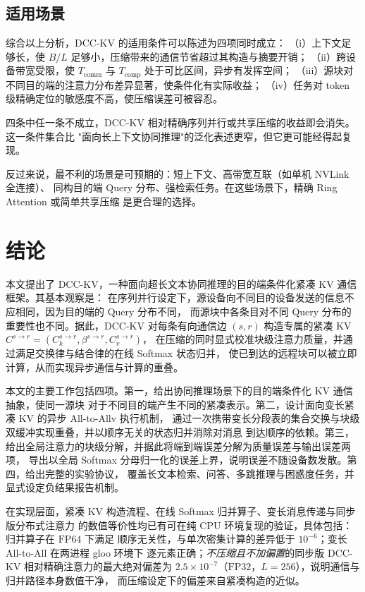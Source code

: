\subsection{适用场景}

综合以上分析，DCC-KV 的适用条件可以陈述为四项同时成立：
（i）上下文足够长，使 $B/L$ 足够小，压缩带来的通信节省超过其构造与摘要开销；
（ii）跨设备带宽受限，使 $T_{\text{comm}}$ 与 $T_{\text{comp}}$ 处于可比区间，异步有发挥空间；
（iii）源块对不同目的端的注意力分布差异显著，使条件化有实际收益；
（iv）任务对 token 级精确定位的敏感度不高，使压缩误差可被容忍。

四条中任一条不成立，DCC-KV 相对精确序列并行或共享压缩的收益即会消失。这一条件集合比
"面向长上下文协同推理"的泛化表述更窄，但它更可能经得起复现。

反过来说，最不利的场景是可预期的：短上下文、高带宽互联（如单机 NVLink 全连接）、
同构目的端 Query 分布、强检索任务。在这些场景下，精确 Ring Attention 或简单共享压缩
是更合理的选择。

\section{结论}
\label{sec:conclusion}

本文提出了 DCC-KV，一种面向超长文本协同推理的目的端条件化紧凑 KV 通信框架。其基本观察是：
在序列并行设定下，源设备向不同目的设备发送的信息不应相同，因为目的端的 Query 分布不同，
而源块中各条目对不同 Query 分布的重要性也不同。据此，DCC-KV 对每条有向通信边 $(s,r)$
构造专属的紧凑 KV $C^{s\to r} = (C_k^{s\to r}, \beta^{s\to r}, C_v^{s\to r})$，
在压缩的同时显式校准块级注意力质量，并通过满足交换律与结合律的在线 Softmax 状态归并，
使已到达的远程块可以被立即计算，从而实现异步通信与计算的重叠。

本文的主要工作包括四项。第一，给出协同推理场景下的目的端条件化 KV 通信抽象，使同一源块
对于不同目的端产生不同的紧凑表示。第二，设计面向变长紧凑 KV 的异步 All-to-Allv 执行机制，
通过一次携带变长分段表的集合交换与块级双缓冲实现重叠，并以顺序无关的状态归并消除对消息
到达顺序的依赖。第三，给出全局注意力的块级分解，并据此将端到端误差分解为质量误差与输出误差两项，
导出以全局 Softmax 分母归一化的误差上界，说明误差不随设备数发散。第四，给出完整的实验协议，
覆盖长文本检索、问答、多跳推理与困惑度任务，并显式设定负结果报告机制。

在实现层面，紧凑 KV 构造流程、在线 Softmax 归并算子、变长消息传递与同步版分布式注意力
的数值等价性均已有可在纯 CPU 环境复现的验证，具体包括：归并算子在 $\mathrm{FP64}$ 下满足
顺序无关性，与单次密集计算的差异低于 $10^{-6}$；变长 All-to-All 在两进程 gloo 环境下
逐元素正确；\emph{不压缩且不加偏置}的同步版 DCC-KV 相对精确注意力的最大绝对偏差为
$2.5\times10^{-7}$（$\mathrm{FP32}$，$L=256$），说明通信与归并路径本身数值干净，
而压缩设定下的偏差来自紧凑构造的近似。

